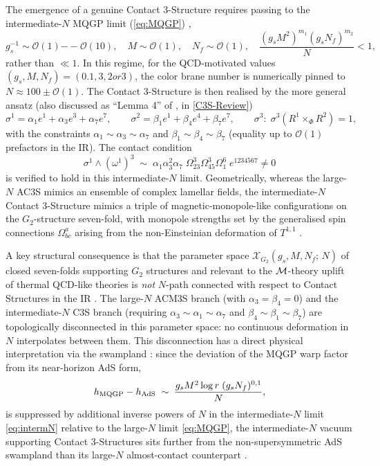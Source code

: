 \documentclass[a4paper,11pt,fleqn]{article}
\theoremstyle{plain}
\theoremstyle{definition}
\begin{document}
The emergence of a genuine Contact 3-Structure requires passing to the intermediate-$N$
MQGP limit (\ref{eq:MQGP}) \cite{ACMS},
\begin{equation}
g_s^{-1} \sim \mathcal{O}(1){--}\mathcal{O}(10),\quad
M \sim \mathcal{O}(1),\quad
N_f \sim \mathcal{O}(1),\quad
\frac{(g_s M^2)^{m_1}(g_s N_f)^{m_2}}{N} < 1,
\label{eq:intermN}
\end{equation}
rather than $\ll 1$. In this regime, for the QCD-motivated values $(g_s, M, N_f) =
(0.1, 3, 2{ or }3)$, the color brane number is numerically pinned to
$N \approx 100 \pm \mathcal{O}(1)$. The Contact 3-Structure is then realised by the
more general ansatz (also discussed as ``Lemma 4'' of \cite{ACMS}, in \ref{C3S-Review})
\begin{equation}
\sigma^1 = \alpha_1 e^1 + \alpha_3 e^3 + \alpha_7 e^7,
\qquad
\sigma^2 = \beta_1 e^1 + \beta_4 e^4 + \beta_7 e^7,
\qquad
\sigma^3:\; \sigma^3(R^1 \times_\Phi R^2) = 1,
\label{eq:C3S}
\end{equation}
with the constraints $\alpha_1 \sim \alpha_3 \sim \alpha_7$ and
$\beta_1 \sim \beta_4 \sim \beta_7$ (equality up to $\mathcal{O}(1)$ prefactors in the IR).
The contact condition
\begin{equation}
\sigma^1 \wedge (\omega^1)^3
\;\sim\;
\alpha_1\alpha_3^2\alpha_7\;\Omega^3_{23}\Omega^3_{45}\Omega^6_1\;
e^{1234567} \neq 0
\end{equation}
is verified to hold in this intermediate-$N$ limit. Geometrically, whereas the large-$N$
AC3S mimics an ensemble of complex lamellar fields, the intermediate-$N$ Contact 3-Structure
mimics a triple of magnetic-monopole-like configurations on the $G_2$-structure seven-fold,
with monopole strengths set by the generalised spin connections $\Omega^a_{bc}$ arising from
the non-Einsteinian deformation of $T^{1,1}$ \cite{ACMS}.

A key structural consequence is that the parameter space
$\mathcal{X}_{G_2}(g_s, M, N_f;\, N)$ of closed seven-folds supporting $G_2$ structures
and relevant to the ${\cal M}$-theory uplift of thermal QCD-like theories is \emph{not}
$N$-path connected with respect to Contact Structures in the IR \cite{ACMS}. The
large-$N$ ACM3S branch (with $\alpha_3 = \beta_4 = 0$) and the intermediate-$N$ C3S branch
(requiring $\alpha_3 \sim \alpha_1 \sim \alpha_7$ and $\beta_4 \sim \beta_1 \sim \beta_7$)
are topologically disconnected in this parameter space: no continuous deformation in $N$
interpolates between them. This disconnection has a direct physical interpretation via the
swampland \cite{Ooguri:2016pdq,Freivogel:2016qwc}: since the deviation of the MQGP warp
factor from its near-horizon AdS form,
\begin{equation}
h_{\rm MQGP} - h_{\rm AdS}
\;\sim\;
\frac{g_s M^2 \log r\;(g_s N_f)^{0,1}}{N},
\end{equation}
is suppressed by additional inverse powers of $N$ in the intermediate-$N$ limit
\eqref{eq:intermN} relative to the large-$N$ limit \eqref{eq:MQGP}, the intermediate-$N$
vacuum supporting Contact 3-Structures sits further from the non-supersymmetric AdS
swampland than its large-$N$ almost-contact counterpart \cite{ACMS}.
\end{document}
